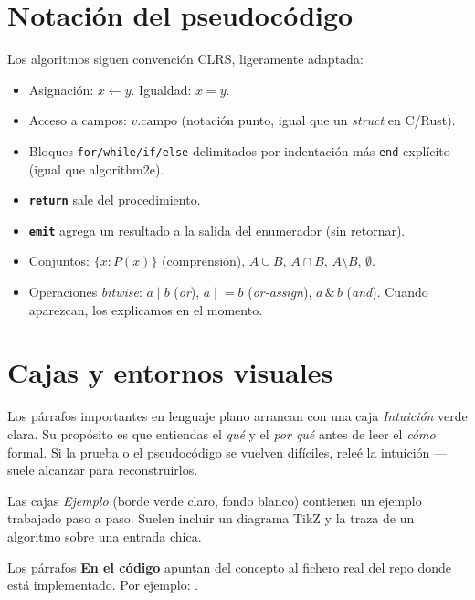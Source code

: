 \section*{Notación del pseudocódigo}

Los algoritmos siguen convención CLRS, ligeramente adaptada:

\begin{itemize}
    \item Asignación: \(x \leftarrow y\). Igualdad: \(x = y\).
    \item Acceso a campos: \(v.\mathrm{campo}\) (notación punto, igual
    que un \emph{struct} en C/Rust).
    \item Bloques \texttt{for/while/if/else} delimitados por
    indentación más \texttt{end} explícito (igual que algorithm2e).
    \item \texttt{\textbf{return}} sale del procedimiento.
    \item \texttt{\textbf{emit}} agrega un resultado a la salida del
    enumerador (sin retornar).
    \item Conjuntos: \(\{x : P(x)\}\) (comprensión), \(A \cup B\),
    \(A \cap B\), \(A \setminus B\), \(\emptyset\).
    \item Operaciones \emph{bitwise}: \(a \mid b\) (\emph{or}),
    \(a \mathrel{|}\!= b\) (\emph{or-assign}), \(a \,\&\, b\)
    (\emph{and}). Cuando aparezcan, los explicamos en el momento.
\end{itemize}

\section*{Cajas y entornos visuales}

\begin{intuicion}
Los párrafos importantes en lenguaje plano arrancan con una caja
\emph{Intuición} verde clara. Su propósito es que entiendas el
\emph{qué} y el \emph{por qué} antes de leer el \emph{cómo} formal.
Si la prueba o el pseudocódigo se vuelven difíciles, releé la
intuición ---suele alcanzar para reconstruirlos.
\end{intuicion}

\begin{ejemplo}
Las cajas \emph{Ejemplo} (borde verde claro, fondo blanco)
contienen un ejemplo trabajado paso a paso. Suelen incluir un
diagrama TikZ y la traza de un algoritmo sobre una entrada chica.
\end{ejemplo}

\begin{enelcodigo}
Los párrafos \textbf{En el código} apuntan del concepto al fichero
real del repo donde está implementado. Por ejemplo:
.
\end{enelcodigo}

